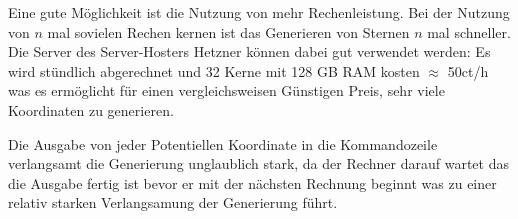Eine gute Möglichkeit ist die Nutzung von mehr Rechenleistung.  Bei der Nutzung
von \( n \) mal sovielen Rechen kernen ist das Generieren von Sternen \( n \)
mal schneller. Die Server des Server-Hosters Hetzner können dabei gut
verwendet werden: Es wird stündlich abgerechnet und 32 Kerne mit 128 GB RAM
kosten \( \approx \) 50ct/h was es ermöglicht für einen vergleichsweisen
Günstigen Preis, sehr viele Koordinaten zu generieren.

Die Ausgabe von jeder Potentiellen Koordinate in die Kommandozeile verlangsamt
die Generierung unglaublich stark, da der Rechner darauf wartet das die Ausgabe
fertig ist bevor er mit der nächsten Rechnung beginnt was zu einer relativ
starken Verlangsamung der Generierung führt.
